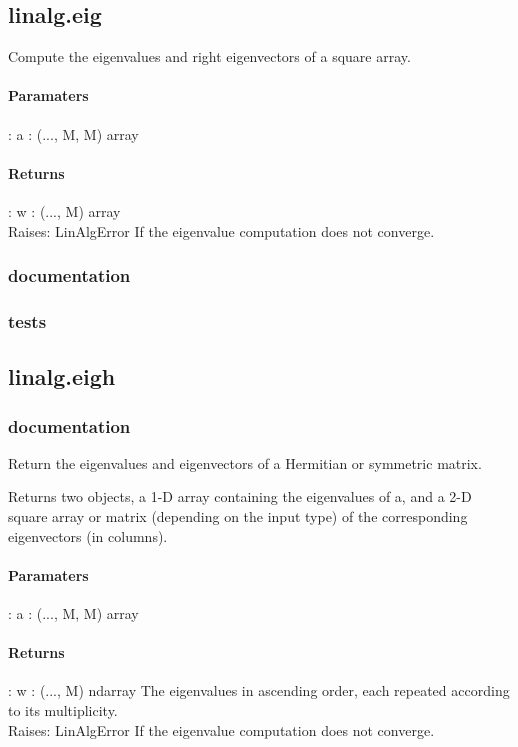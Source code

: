 \documentclass[a4paper,11pt]{article}
\begin{document}
\subsection{linalg.eig}
Compute the eigenvalues and right eigenvectors of a square array.
\paragraph{Paramaters}: 
a : (..., M, M) array\\
\paragraph{Returns}:    
w : (..., M) array\\
Raises: 
LinAlgError
If the eigenvalue computation does not converge.

\subsubsection{documentation}
\subsubsection{tests}
\subsection{linalg.eigh}

\subsubsection{documentation}
Return the eigenvalues and eigenvectors of a Hermitian or symmetric matrix.

Returns two objects, a 1-D array containing the eigenvalues of a, and a 2-D square array or matrix (depending on the input type) of the corresponding eigenvectors (in columns).
\paragraph{Paramaters}: 
a : (..., M, M) array\\
\paragraph{Returns}:    
w : (..., M) ndarray
The eigenvalues in ascending order, each repeated according to its multiplicity.\\
Raises: 
LinAlgError
If the eigenvalue computation does not converge.\\
\end{document}
